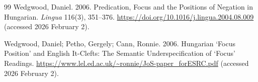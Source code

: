\documentclass[ruler]{CUP-JNL-LIN}%
\begin{document}
\begin{Backmatter}
\begin{thebibliography}{99}
{Wedgwood, Daniel}. 2006. Predication, Focus and the Positions of Negation in Hungarian. \textit{Lingua} 116(3), 351--376. \url{https://doi.org/10.1016/j.lingua.2004.08.009} (accessed 2026 February 2).




{Wedgwood, Daniel; Petho, Gergely; Cann, Ronnie}. 2006. Hungarian ‘Focus Position’ and English It-Clefts: The Semantic Underspecification of ‘Focus’ Readings. \url{https://www.lel.ed.ac.uk/~ronnie/JoS-paper_forESRC.pdf} (accessed 2026 February 2).




\end{thebibliography}
\end{Backmatter}
\end{document}
